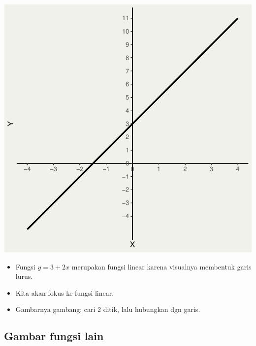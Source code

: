 \documentclass[
  letterpaper,
  DIV=11,
  numbers=noendperiod]{scrartcl}
\begin{document}
\includegraphics{index_files/figure-pdf/unnamed-chunk-4-1.pdf}

\begin{itemize}
\item
  Fungsi \(y=3+2x\) merupakan fungsi linear karena visualnya membentuk
  garis lurus.
\item
  Kita akan fokus ke fungsi linear.
\item
  Gambarnya gambang: cari 2 ditik, lalu hubungkan dgn garis.
\end{itemize}

\subsection{Gambar fungsi lain}\label{gambar-fungsi-lain}
\end{document}
